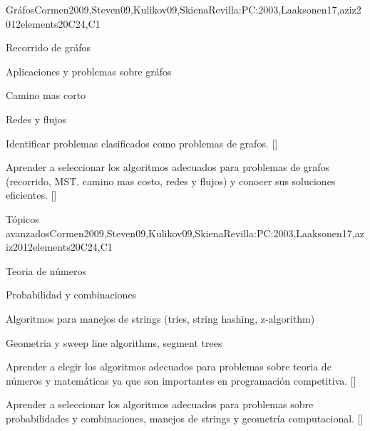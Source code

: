\begin{syllabus}
  \begin{unit}{Gráfos}{}{Cormen2009,Steven09,Kulikov09,SkienaRevilla:PC:2003,Laaksonen17,aziz2012elements}{20}{C24,C1}
    \begin{topics}
      \item Recorrido de gráfos 
      \item Aplicaciones y problemas sobre gráfos
      \item Camino mas corto
      \item Redes y flujos 
    \end{topics}
    \begin{learningoutcomes}
        \item Identificar problemas clasificados como problemas de grafos. [\Usage]
        \item Aprender a seleccionar los algoritmos adecuados para problemas de grafos (recorrido, MST, camino mas costo, redes y flujos) y conocer sus soluciones eficientes. [\Usage]
    \end{learningoutcomes}
  \end{unit}
  
  \begin{unit}{Tópicos avanzados}{}{Cormen2009,Steven09,Kulikov09,SkienaRevilla:PC:2003,Laaksonen17,aziz2012elements}{20}{C24,C1}
    \begin{topics}
      \item Teoria de números
      \item Probabilidad y combinaciones
      \item Algoritmos para manejos de strings (tries, string hashing, z-algorithm)
      \item Geometria y sweep line algorithms, segment trees
    \end{topics}
    \begin{learningoutcomes}
        \item Aprender a elegir los algoritmos adecuados para problemas sobre teoria de números y matemáticas ya que son importantes en programación competitiva. [\Usage]
        \item Aprender a seleccionar los algoritmos adecuados para problemas sobre probabilidades y combinaciones,  manejos de strings y geometría computacional. [\Usage]
    \end{learningoutcomes}
  \end{unit}
  

\end{syllabus}
